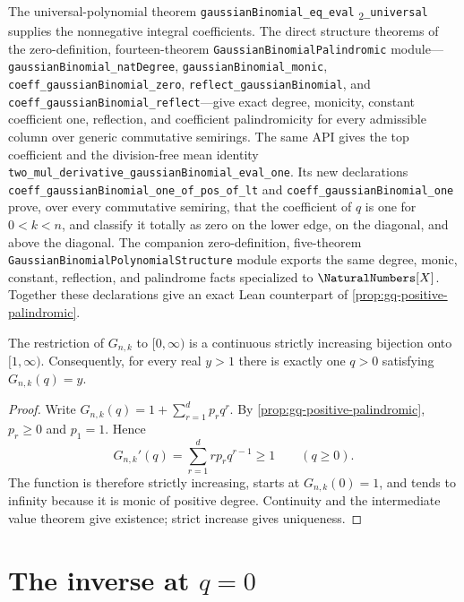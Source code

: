 \begin{remark}
The universal-polynomial theorem
\texttt{gaussianBinomial\_\allowbreak{}eq\_\allowbreak{}eval}%
\textsubscript{2}\allowbreak{}\texttt{\_universal} supplies the nonnegative
integral coefficients.  The direct structure theorems of the
zero-definition, fourteen-theorem
\nolinkurl{GaussianBinomialPalindromic} module---
\nolinkurl{gaussianBinomial_natDegree},
\nolinkurl{gaussianBinomial_monic},
\nolinkurl{coeff_gaussianBinomial_zero},
\nolinkurl{reflect_gaussianBinomial}, and
\nolinkurl{coeff_gaussianBinomial_reflect}---give exact degree,
monicity, constant coefficient one, reflection, and coefficient
palindromicity for every admissible column over generic commutative
semirings.  The same API gives the top coefficient and the division-free
mean identity \nolinkurl{two_mul_derivative_gaussianBinomial_eval_one}.
Its new declarations
\nolinkurl{coeff_gaussianBinomial_one_of_pos_of_lt} and
\nolinkurl{coeff_gaussianBinomial_one} prove, over every commutative
semiring, that the coefficient of \(q\) is one for \(0<k<n\), and classify
it totally as zero on the lower edge, on the diagonal, and above the
diagonal.
The companion zero-definition, five-theorem
\nolinkurl{GaussianBinomialPolynomialStructure} module exports the same
degree, monic, constant, reflection, and palindrome facts specialized to
\(\NaturalNumbers[X]\).  Together these declarations give an exact Lean
counterpart of \cref{prop:gq-positive-palindromic}.
\end{remark}

\begin{theorem}
\label{thm:gq-positive-inverse}
The restriction of \(G_{n,k}\) to \([0,\infty)\) is a continuous strictly
increasing bijection onto \([1,\infty)\).  Consequently, for every real
\(y>1\) there is exactly one \(q>0\) satisfying \(G_{n,k}(q)=y\).
\end{theorem}

\begin{proof}
Write \(G_{n,k}(q)=1+\sum_{r=1}^{d}p_rq^r\).  By
\cref{prop:gq-positive-palindromic}, \(p_r\ge0\) and \(p_1=1\).  Hence
\[
  G_{n,k}'(q)=\sum_{r=1}^{d}rp_rq^{r-1}\ge1
  \qquad(q\ge0).
\]
The function is therefore strictly increasing, starts at \(G_{n,k}(0)=1\),
and tends to infinity because it is monic of positive degree.  Continuity and
the intermediate value theorem give existence; strict increase gives
uniqueness.
\end{proof}

\section{\texorpdfstring{The inverse at \(q=0\)}{The inverse at q=0}}
\label{sec:gaussian-zero}


